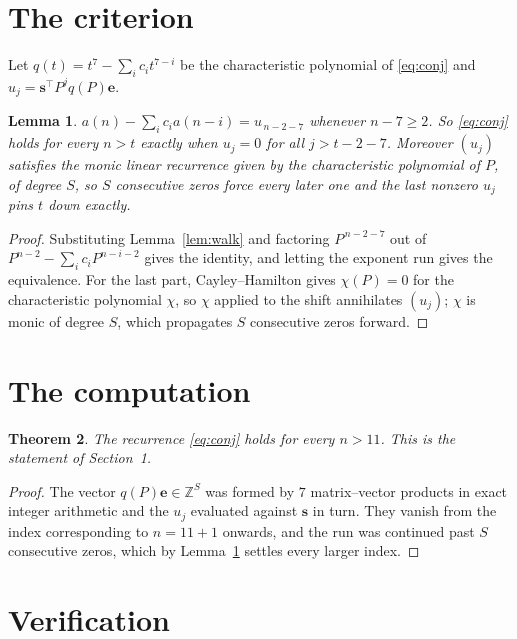\documentclass[11pt,a4paper]{article}
\theoremstyle{plain}
\newtheorem{theorem}{Theorem}
\newtheorem{lemma}[theorem]{Lemma}
\theoremstyle{definition}
\begin{document}
\section{The criterion}

Let $q(t)=t^{7}-\sum_i c_i t^{7-i}$ be the characteristic polynomial of
\eqref{eq:conj} and $u_j=\mathbf{s}^{\!\top}P^{j}q(P)\mathbf{e}$.

\begin{lemma}\label{lem:crit}
$a(n)-\sum_i c_i a(n-i)=u_{\,n-2-7}$ whenever $n-7\ge2$. So \eqref{eq:conj}
holds for every $n>t$ exactly when $u_j=0$ for all $j>t-2-7$. Moreover $(u_j)$
satisfies the monic linear recurrence given by the characteristic polynomial of $P$, of
degree $S$, so $S$ consecutive zeros force every later one and the last nonzero $u_j$ pins
$t$ down exactly.
\end{lemma}

\begin{proof}
Substituting Lemma~\ref{lem:walk} and factoring $P^{\,n-2-7}$ out of
$P^{n-2}-\sum_i c_i P^{n-i-2}$ gives the identity, and letting the exponent run gives the
equivalence. For the last part, Cayley--Hamilton gives $\chi(P)=0$ for the characteristic
polynomial $\chi$, so $\chi$ applied to the shift annihilates $(u_j)$; $\chi$ is monic of
degree $S$, which propagates $S$ consecutive zeros forward.
\end{proof}

\section{The computation}

\begin{theorem}
The recurrence \eqref{eq:conj} holds for every $n>11$. This is the statement of
Section~1.
\end{theorem}

\begin{proof}
The vector $q(P)\mathbf{e}\in\mathbb{Z}^{S}$ was formed by $7$ matrix--vector
products in exact integer arithmetic and the $u_j$ evaluated against $\mathbf{s}$ in turn.
They vanish from the index corresponding to $n=11+1$ onwards, and the run was continued
past $S$ consecutive zeros, which by Lemma~\ref{lem:crit} settles every larger index.
\end{proof}

\section{Verification}
\end{document}
